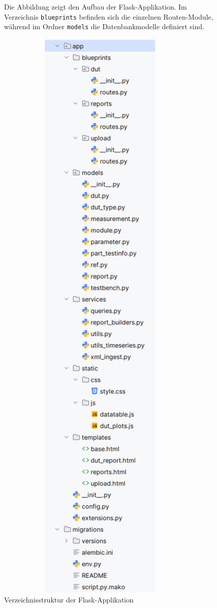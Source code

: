 \begin{figure}[H]
  \centering
    \begin{minipage}{0.8\textwidth}
    \small
    Die Abbildung zeigt den Aufbau der Flask-Applikation.
    Im Verzeichnis \texttt{blueprints} befinden sich die einzelnen Routen-Module,
    während im Ordner \texttt{models} die Datenbankmodelle definiert sind.
  \end{minipage}
  \begin{minipage}{0.2\textwidth}
    \includegraphics[width=0.9\textwidth, height=0.8\textheight, keepaspectratio]{Grafiken/App-Ordnerstruktur.png}
    \caption{Verzeichnisstruktur der Flask-Applikation}
    \label{fig:app-structure}
  \end{minipage}\hfill


\end{figure}
